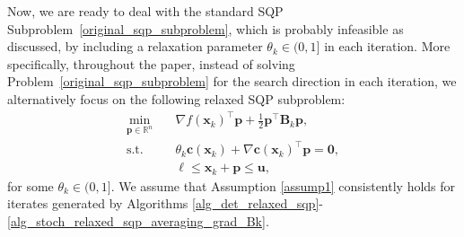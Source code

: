 \documentclass[aos]{imsart}
\numberwithin{equation}{section}
\theoremstyle{plain}
\begin{document}
Now, we are ready to deal with the standard SQP Subproblem~\eqref{original_sqp_subproblem}, which is probably infeasible as discussed, by including a relaxation parameter $\theta_k \in (0,1]$ in each iteration.
More specifically, throughout the paper, instead of solving Problem~\eqref{original_sqp_subproblem} for the search direction in each iteration, we alternatively focus on the following relaxed SQP subproblem:
\begin{equation}
\label{relaxed_sqp_subproblem}
    \begin{split}
        \min_{\bm{p} \in \mathbb{R}^{n}} & \hspace{1em} \nabla f(\bm{x}_k)^{\top}\bm{p}+ \frac{1}{2}\bm{p}^{\top}\bm{B}_k\bm{p},\\
        \text{s.t.} & \hspace{1em} \theta_k \bm{c}(\bm{x}_k)+\nabla \bm{c}(\bm{x}_k)^{\top}\bm{p} = \bm{0},\\
        & \hspace{1em} \bm{\ell} \leq \bm{x}_k + \bm{p} \leq \bm{u},
    \end{split}    
\end{equation} 
for some $\theta_k \in (0,1]$.
We assume that Assumption \ref{assump1} consistently holds for iterates generated by  Algorithms \ref{alg_det_relaxed_sqp}-\ref{alg_stoch_relaxed_sqp_averaging_grad_Bk}.
\end{document}
